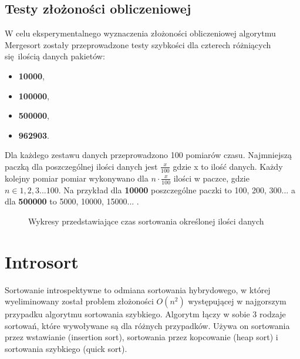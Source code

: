 \documentclass[12pt]{article}
\begin{document}
\subsection{Testy złożoności obliczeniowej}
W celu eksperymentalnego wyznaczenia złożoności obliczeniowej algorytmu Mergesort zostały przeprowadzone testy szybkości dla 
czterech różniących się ilością danych pakietów: 
\begin{itemize}
       \item \textbf{10000},
       \item  \textbf{100000},
       \item \textbf{500000},
       \item \textbf{962903}.
\end{itemize}
Dla każdego zestawu danych przeprowadzono 100 pomiarów czasu. Najmniejszą paczką dla poszczególnej ilości danych jest 
$\frac{x}{100}$ gdzie x to ilość danych. Każdy kolejny pomiar pomiar wykonywano dla $n \cdot \frac{x}{100}$ ilości w paczce,
gdzie $n \in 1,2,3 ... 100$.
Na przykład dla \textbf{10000} poszczególne paczki to 100, 200, 300... a dla \textbf{500000} to 5000, 10000, 15000... .

\begin{figure}[H]
       \centering
       \quad
\end{figure}
\begin{figure}[H]\ContinuedFloat
       \centering
       
       \quad
       \renewcommand{\figurename}{Wykres.}
       \caption{Wykresy przedstawiające czas sortowania określonej ilości danych}
       \label{fig: mergesort}
\end{figure}


\section{Introsort}\label{ch: introsort}
Sortowanie introspektywne to odmiana sortowania hybrydowego, w której wyeliminowany został
problem złożoności $O(n^2)$ występującej w najgorszym przypadku algorytmu sortowania szybkiego.
Algorytm łączy w sobie 3 rodzaje sortowań, które wywoływane są dla różnych przypadków.
Używa on sortowania przez wstawianie (insertion sort), sortowania przez kopcowanie (heap sort)
i sortowania szybkiego (quick sort).
\end{document}
